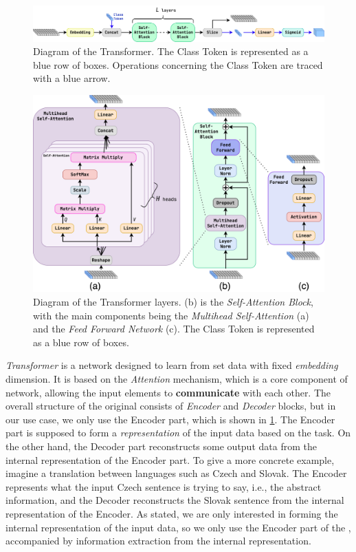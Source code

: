 \begin{figure}[htb]
    \centering
    \includegraphics[width=1.\linewidth]{src/diagrams/transformer.png}
    \caption{Diagram of the Transformer. The Class Token is represented as a blue row of boxes. Operations concerning the Class Token are traced with a blue arrow.}
    \label{fig:trans}
\end{figure}

\begin{figure}[htb]
    \centering
    \includegraphics[width=0.9\linewidth]{src/diagrams/transformer_layers.png}
    \caption{Diagram of the Transformer layers. (b) is the \emph{Self-Attention Block}, with the main components being the \emph{Multihead Self-Attention} (a) and the \emph{Feed Forward Network} (c). The Class Token is represented as a blue row of boxes.}
    \label{fig:trans_layers}
\end{figure}

\emph{Transformer} \cite{att_is_all} is a network designed to learn from set data with fixed \emph{embedding} dimension.
It is based on the \emph{Attention} mechanism, which is a core component of \trans network, allowing the input elements to \textbf{communicate} with each other.
The overall structure of the original \trans consists of \emph{Encoder} and \emph{Decoder} blocks, but in our use case, we only use the Encoder part, which is shown in \cref{fig:trans}.
The Encoder part is supposed to form a \emph{representation} of the input data based on the task.
On the other hand, the Decoder part reconstructs some output data from the internal representation of the Encoder part.
To give a more concrete example, imagine a translation between languages such as Czech and Slovak.
The Encoder represents what the input Czech sentence is trying to say, i.e., the abstract information, and the Decoder reconstructs the Slovak sentence from the internal representation of the Encoder.
As stated, we are only interested in forming the internal representation of the input data, so we only use the Encoder part of the \trans, accompanied by information extraction from the internal representation.

